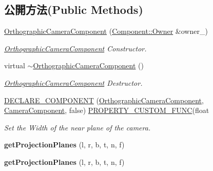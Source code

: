 \subsection*{公開方法(Public Methods)}
\begin{DoxyCompactItemize}
\item 
\hyperlink{class_magnum_1_1_orthographic_camera_component_a0f44d5eef1e6d2da9ffd83815e357f8e}{Orthographic\+Camera\+Component} (\hyperlink{class_magnum_1_1_component_1_1_owner}{Component\+::\+Owner} \&owner\+\_\+)
\begin{DoxyCompactList}\small\item\em \hyperlink{class_magnum_1_1_orthographic_camera_component}{Orthographic\+Camera\+Component} Constructor. \end{DoxyCompactList}\item 
virtual \hyperlink{class_magnum_1_1_orthographic_camera_component_a10165141f6f076d9a488f3ac9f7f644e}{$\sim$\+Orthographic\+Camera\+Component} ()
\begin{DoxyCompactList}\small\item\em \hyperlink{class_magnum_1_1_orthographic_camera_component}{Orthographic\+Camera\+Component} Destructor. \end{DoxyCompactList}\item 
\hyperlink{class_magnum_1_1_orthographic_camera_component_afe65f04d4c212238b025864112199d82}{D\+E\+C\+L\+A\+R\+E\+\_\+\+C\+O\+M\+P\+O\+N\+E\+NT} (\hyperlink{class_magnum_1_1_orthographic_camera_component}{Orthographic\+Camera\+Component}, \hyperlink{class_magnum_1_1_camera_component}{Camera\+Component}, false)   \hyperlink{class_magnum_1_1_orthographic_camera_component_a8189ecbd193694963ea6057690a79f99}{P\+R\+O\+P\+E\+R\+T\+Y\+\_\+\+C\+U\+S\+T\+O\+M\+\_\+\+F\+U\+NC}(float
\begin{DoxyCompactList}\small\item\em Set the Width of the near plane of the camera. \end{DoxyCompactList}\item 
{\bfseries get\+Projection\+Planes} (l, r, b, t, n, f)\hypertarget{class_magnum_1_1_orthographic_camera_component_a9f6aca7ce6e4c1a7eab1b38a189c819d}{}\label{class_magnum_1_1_orthographic_camera_component_a9f6aca7ce6e4c1a7eab1b38a189c819d}

\item 
{\bfseries get\+Projection\+Planes} (l, r, b, t, n, f)\hypertarget{class_magnum_1_1_orthographic_camera_component_a9f6aca7ce6e4c1a7eab1b38a189c819d}{}\label{class_magnum_1_1_orthographic_camera_component_a9f6aca7ce6e4c1a7eab1b38a189c819d}


\end{DoxyCompactItemize}
